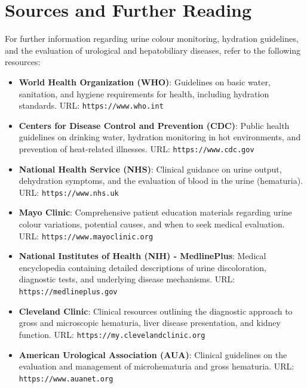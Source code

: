 \section*{Sources and Further Reading}
For further information regarding urine colour monitoring, hydration guidelines, and the evaluation of urological and hepatobiliary diseases, refer to the following resources:

\begin{itemize}
  \item \textbf{World Health Organization (WHO)}: Guidelines on basic water, sanitation, and hygiene requirements for health, including hydration standards. \newline URL: \texttt{https://www.who.int}

  \item \textbf{Centers for Disease Control and Prevention (CDC)}: Public health guidelines on drinking water, hydration monitoring in hot environments, and prevention of heat-related illnesses. \newline URL: \texttt{https://www.cdc.gov}

  \item \textbf{National Health Service (NHS)}: Clinical guidance on urine output, dehydration symptoms, and the evaluation of blood in the urine (hematuria). \newline URL: \texttt{https://www.nhs.uk}

  \item \textbf{Mayo Clinic}: Comprehensive patient education materials regarding urine colour variations, potential causes, and when to seek medical evaluation. \newline URL: \texttt{https://www.mayoclinic.org}

  \item \textbf{National Institutes of Health (NIH) - MedlinePlus}: Medical encyclopedia containing detailed descriptions of urine discoloration, diagnostic tests, and underlying disease mechanisms. \newline URL: \texttt{https://medlineplus.gov}

  \item \textbf{Cleveland Clinic}: Clinical resources outlining the diagnostic approach to gross and microscopic hematuria, liver disease presentation, and kidney function. \newline URL: \texttt{https://my.clevelandclinic.org}

  \item \textbf{American Urological Association (AUA)}: Clinical guidelines on the evaluation and management of microhematuria and gross hematuria. \newline URL: \texttt{https://www.auanet.org}
\end{itemize}